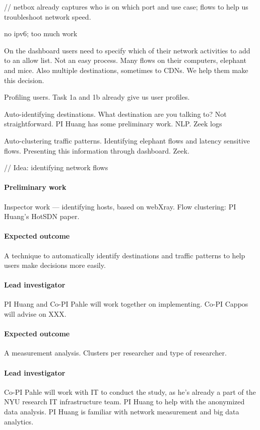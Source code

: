 // netbox already captures who is on which port and use case; flows to help us troubleshoot network speed.

no ipv6; too much work




On the dashboard users need to specify which of their network activities to add to an allow list. Not an easy process. Many flows on their computers, elephant and mice. Also multiple destinations, sometimes to CDNs. We help them make this decision.

Profiling users. Task 1a and 1b already give us user profiles.

Auto-identifying destinations. What destination are you talking to? Not straightforward. PI Huang has some preliminary work. NLP. Zeek logs

Auto-clustering traffic patterns. Identifying elephant flows and latency sensitive flows. Presenting this information through dashboard.  Zeek.

// Idea: identifying network flows

\paragraph{Preliminary work} Inspector work — identifying hosts, based on webXray. Flow clustering: PI Huang's HotSDN paper.

\paragraph{Expected outcome} A technique to automatically identify destinations and traffic patterns to help users make decisions more easily.

\paragraph{Lead investigator} PI Huang and Co-PI Pahle will work together on implementing. Co-PI Cappos will advise on XXX.



\paragraph{Expected outcome} A measurement analysis. Clusters per researcher and type of researcher.

\paragraph{Lead investigator} Co-PI Pahle will work with IT to conduct the study, as he's already a part of the NYU research IT infrastructure team. PI Huang to help with the anonymized data analysis. PI Huang is familiar with network measurement and big data analytics.
